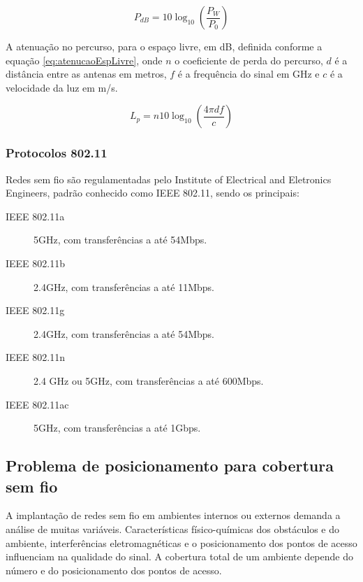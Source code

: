 \documentclass[tc,twoside]{iiufrgs}
\begin{document}
\begin{equation}
P_{dB} = 10 \log_{10} \left (\frac{P_W}{P_0} \right )
\label{eq:pwdb}
\end{equation}

A atenuação no percurso, para o espaço livre, em dB, definida conforme a equação \ref{eq:atenucaoEspLivre}, onde $n$ o coeficiente de perda do percurso, $d$ é a distância entre as antenas em metros, $f$ é a frequência do sinal em GHz e $c$ é a velocidade da luz em m/s. \cite{haykin2009sistemas}

\begin{equation}
{L}_{p} = n10\log_{10}{\left ( \frac{4\pi df}{c} \right )}
\label{eq:atenucaoEspLivre}
\end{equation}


\subsubsection{Protocolos 802.11}

Redes sem fio são regulamentadas pelo Institute of Electrical and Eletronics Engineers, padrão conhecido como IEEE 802.11, sendo os principais: \cite{tanenbaum2003redes} %

\begin{description}
\item[IEEE 802.11a] 5GHz, com transferências a até 54Mbps.
\item[IEEE 802.11b] 2.4GHz, com transferências a até 11Mbps.
\item[IEEE 802.11g] 2.4GHz, com transferências a até 54Mbps.
\item[IEEE 802.11n] 2.4 GHz ou 5GHz, com transferências a até 600Mbps.
\item[IEEE 802.11ac] 5GHz, com transferências a até 1Gbps.
\end{description} %
 
\subsection{Problema de posicionamento para cobertura sem fio}

A implantação de redes sem fio em ambientes internos ou externos demanda a análise de muitas variáveis. Características físico-químicas dos obstáculos e do ambiente, interferências eletromagnéticas e o posicionamento dos pontos de acesso influenciam na qualidade do sinal. A cobertura total de um ambiente depende do número e do posicionamento dos pontos de acesso. \cite {freytag2013desenvolvimento}%
\end{document}
